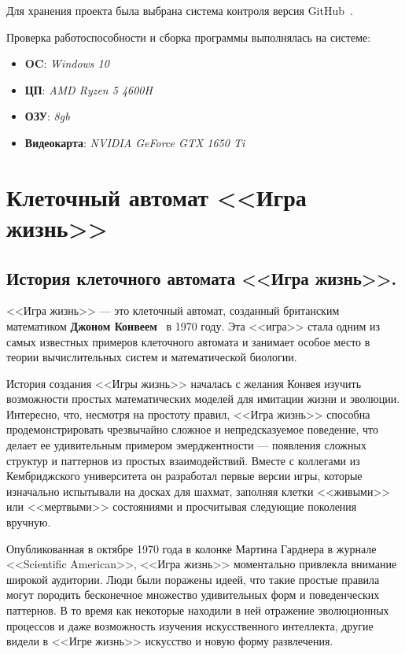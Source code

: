 Для хранения проекта была выбрана система контроля версия GitHub~\cite{wikiRUGitHub}.

Проверка работоспособности и сборка программы выполнялась на системе:
	\begin{itemize}
		\item \textbf{OC}: \textit{Windows 10}
		\item \textbf{ЦП}: \textit{AMD Ryzen 5 4600H}
		\item \textbf{ОЗУ}: \textit{8gb}
		\item \textbf{Видеокарта}: \textit{NVIDIA GeForce GTX 1650 Ti}
	\end{itemize}

\section{\label{sec:ch01/sec04}Клеточный автомат <<Игра жизнь>>}
\subsection{\label{subsec:ch01/sec04/subsec01}История клеточного автомата <<Игра жизнь>>.}

<<Игра жизнь>> --- это клеточный автомат, созданный британским математиком \textbf{Джоном Конвеем}~\cite{Convei} в 1970 году. Эта <<игра>> стала одним из самых известных примеров клеточного автомата и занимает особое место в теории вычислительных систем и математической биологии.

История создания <<Игры жизнь>> началась с желания Конвея изучить возможности простых математических моделей для имитации жизни и эволюции. Интересно, что, несмотря на простоту правил, <<Игра жизнь>> способна продемонстрировать чрезвычайно сложное и непредсказуемое поведение, что делает ее удивительным примером эмерджентности — появления сложных структур и паттернов из простых взаимодействий. Вместе с коллегами из Кембриджского университета он разработал первые версии игры, которые изначально испытывали на досках для шахмат, заполняя клетки <<живыми>> или <<мертвыми>> состояниями и просчитывая следующие поколения вручную.

Опубликованная в октябре 1970 года в колонке Мартина Гарднера в журнале <<Scientific American>>, <<Игра жизнь>> моментально привлекла внимание широкой аудитории. Люди были поражены идеей, что такие простые правила могут породить бесконечное множество удивительных форм и поведенческих паттернов. В то время как некоторые находили в ней отражение эволюционных процессов и даже возможность изучения искусственного интеллекта, другие видели в <<Игре жизнь>> искусство и новую форму развлечения.


